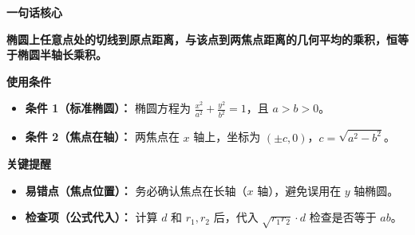 \begin{summarybox}
\textbf{\textcolor{CSummary}{一句话核心}}

\textbf{椭圆上任意点处的切线到原点距离，与该点到两焦点距离的几何平均的乘积，恒等于椭圆半轴长乘积。}

\par\medskip\noindent
\textbf{\textcolor{CSummary}{使用条件}}
\begin{itemize}[leftmargin=*, itemsep=0.5em, topsep=0.4em]
    \item \textbf{条件 1（标准椭圆）：} 椭圆方程为 $\frac{x^2}{a^2}+\frac{y^2}{b^2}=1$，且 $a>b>0$。
    \item \textbf{条件 2（焦点在轴）：} 两焦点在 $x$ 轴上，坐标为 $(\pm c,0)$，$c=\sqrt{a^2-b^2}$。
\end{itemize}

\par\medskip\noindent
\textbf{\textcolor{CSummary}{关键提醒}}
\begin{itemize}[leftmargin=*, itemsep=0.5em, topsep=0.4em]
    \item \textbf{易错点（焦点位置）：} 务必确认焦点在长轴（$x$ 轴），避免误用在 $y$ 轴椭圆。
    \item \textbf{检查项（公式代入）：} 计算 $d$ 和 $r_1,r_2$ 后，代入 $\sqrt{r_1 r_2}\cdot d$ 检查是否等于 $ab$。
\end{itemize}
\end{summarybox}
